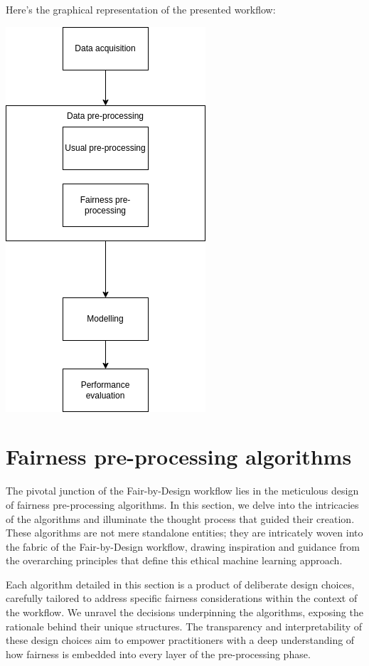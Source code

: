 Here's the graphical representation of the presented workflow:

\begin{center}

\includegraphics[width=.5\textwidth, height=1.0\textwidth]{fairness-workflow.png}

\end{center}

\newpage
\section{Fairness pre-processing algorithms}
\label{section:fairness}

The pivotal junction of the Fair-by-Design workflow lies in the meticulous design of fairness pre-processing algorithms. In this section, we delve into the intricacies of the algorithms and illuminate the thought process that guided their creation. These algorithms are not mere standalone entities; they are intricately woven into the fabric of the Fair-by-Design workflow, drawing inspiration and guidance from the overarching principles that define this ethical machine learning approach.

Each algorithm detailed in this section is a product of deliberate design choices, carefully tailored to address specific fairness considerations within the context of the workflow. We unravel the decisions underpinning the algorithms, exposing the rationale behind their unique structures. The transparency and interpretability of these design choices aim to empower practitioners with a deep understanding of how fairness is embedded into every layer of the pre-processing phase.

